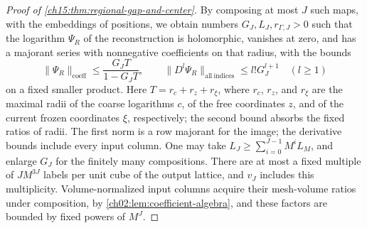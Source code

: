 \begin{proof}[Proof of \cref{ch15:thm:regional-gap-and-center}]
By composing at most $J$ such maps, with the embeddings of positions, we obtain numbers $G_J,L_J,r_{\Gamma,J}>0$ such that the logarithm $\Psi_R$ of the reconstruction is holomorphic, vanishes at zero, and has a majorant series with nonnegative coefficients on that radius, with the bounds
\begin{equation}\label{ch15:eq:raw-majorant}
 \|\Psi_R\|_{\mathrm{coeff}}
    \le\frac{G_J T}{1-G_JT},\qquad
 \|D^l\Psi_R\|_{\mathrm{all\ indices}}
    \le l!G_J^{l+1}\quad(l\ge1)
\end{equation}
on a fixed smaller product. Here $T=r_c+r_z+r_\xi$, where $r_c$, $r_z$, and $r_\xi$ are the maximal radii of the coarse logarithms $c$, of the free coordinates $z$, and of the current frozen coordinates $\xi$, respectively; the second bound absorbs the fixed ratios of radii. The first norm is a row majorant for the image; the derivative bounds include every input column. One may take $L_J\ge\sum_{i=0}^{J-1}M^iL_M$, and enlarge $G_J$ for the finitely many compositions. There are at most a fixed multiple of $JM^{3J}$ labels per unit cube of the output lattice, and $v_J$ includes this multiplicity. Volume-normalized input columns acquire their mesh-volume ratios under composition, by \cref{ch02:lem:coefficient-algebra}, and these factors are bounded by fixed powers of $M^J$.


\end{proof}

